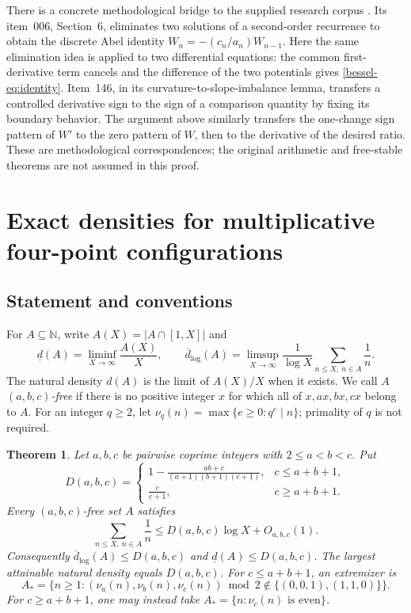 \documentclass[11pt,a4paper]{article}
\newtheorem{theorem}{Theorem}[section]
\theoremstyle{remark}\newtheorem{remark}[theorem]{Remark}
\newcommand{\N}{\mathbb N}
\numberwithin{equation}{section}
\begin{document}
There is a concrete methodological bridge to the supplied research
corpus \cite{VMRC}. Its item~006, Section~6, eliminates two solutions
of a second-order recurrence to obtain the discrete Abel identity
$W_n=-(c_n/a_n)W_{n-1}$. Here the same elimination idea is applied
to two differential equations: the common first-derivative term
cancels and the difference of the two potentials gives
\eqref{bessel-eq:identity}. Item~146, in its curvature-to-slope-imbalance
lemma, transfers a controlled derivative sign to the sign of a
comparison quantity by fixing its boundary behavior. The argument
above similarly transfers the one-change sign pattern of $W'$ to
the zero pattern of $W$, then to the derivative of the desired ratio.
These are methodological correspondences; the original arithmetic
and free-stable theorems are not assumed in this proof.

\section{Exact densities for multiplicative four-point configurations}
\label{sec:density}
\subsection{Statement and conventions}
For $A\subseteq\N$, write $A(X)=|A\cap[1,X]|$ and
\[
\underline d(A)=\liminf_{X\to\infty}\frac{A(X)}X,
\qquad
\overline d_{\log}(A)=\limsup_{X\to\infty}
\frac1{\log X}\sum_{n\le X,\ n\in A}\frac1n.
\]
The natural density $d(A)$ is the limit of $A(X)/X$ when it exists.
We call $A$ \emph{$(a,b,c)$-free} if there is no positive integer $x$
for which all of $x,ax,bx,cx$ belong to $A$.
For an integer $q\ge2$, let
$\nu_q(n)=\max\{e\ge0:q^e\mid n\}$; primality of $q$ is not required.

\begin{theorem}\label{density-thm:main}
Let $a,b,c$ be pairwise coprime integers with $2\le a<b<c$. Put
\[
D(a,b,c)=
\begin{cases}
\displaystyle 1-\frac{ab+c}{(a+1)(b+1)(c+1)},&c\le a+b+1,\\[5pt]
\displaystyle \frac{c}{c+1},&c\ge a+b+1.
\end{cases}
\]
Every $(a,b,c)$-free set $A$ satisfies
\[
\sum_{n\le X,\ n\in A}\frac1n\le D(a,b,c)\log X+O_{a,b,c}(1).
\]
Consequently $\overline d_{\log}(A)\le D(a,b,c)$ and
$\underline d(A)\le D(a,b,c)$. The largest attainable natural
density equals $D(a,b,c)$.
For $c\le a+b+1$, an extremizer is
\[
 A_* =\{n\ge1:
 (\nu_a(n),\nu_b(n),\nu_c(n))\bmod2
 \notin\{(0,0,1),(1,1,0)\}\}.
\]
For $c\ge a+b+1$, one may instead take
$A_* =\{n:\nu_c(n)\text{ is even}\}$.
\end{theorem}
\end{document}
